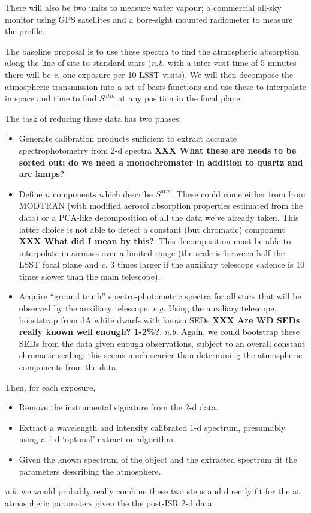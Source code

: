 \documentclass[12pt]{article}
\renewcommand{\c}{\textit{c.}\xspace}
\newcommand{\eg}{\textit{e.g.}\xspace}
\newcommand{\nb}{\textit{n.b.}\xspace}
\newcommand{\XXX}[1]{\textbf{XXX #1}\xspace}
\begin{document}
There will also be two units to measure water vapour;  a commercial all-sky monitor using GPS satellites
and a bore-sight mounted radiometer to measure the profile.

The baseline proposal is to use these spectra to find the atmospheric absorption along the line of site to
standard stars (\nb with a inter-visit time of 5 minutes there will be \c one exposure per 10 LSST visits).
We will then decompose the atmospheric transmission into a set of basis functions and use these to interpolate
in space and time to find $S^{atm}$ at any position in the focal plane.

The task of reducing these data has two phases:
\begin{itemize}
  \item Generate calibration products sufficient to extract accurate spectrophotometry from 2-d spectra
    \XXX{What these are needs to be sorted out; do we need a monochromater in addition to quartz and arc
      lamps?}

  \item Define $n$ components which describe $S^{atm}$.  These could come either from
    from MODTRAN (with modified aerosol absorption properties estimated from the data) or
    a PCA-like decomposition of all the data we've already taken.
    This latter choice is not able to detect a
    constant (but chromatic) component \XXX{What did I mean by this?}.  This decomposition must be able to interpolate in airmass over
    a limited range (the scale is between half the LSST focal plane and \c 3 times larger if the auxiliary
    telescope cadence is 10 times slower than the main telescope).

  \item Acquire ``ground truth'' spectro-photometric spectra for all stars that will be observed by the
    auxiliary telescope.  \eg Using the auxiliary telescope, booststrap from dA white dwarfs with
    known SEDs \XXX{Are WD SEDs really known well enough?  1-2\%?}.  \nb  Again, we could bootstrap
    these SEDs from the data given enough observations, subject to an overall constant chromatic scaling;
    this seems much scarier than determining the atmospheric components from the data.
\end{itemize}

Then, for each exposure,
\begin{itemize}
  \item Remove the instrumental signature from the 2-d data.
  \item Extract a wavelength and intensity calibrated 1-d spectrum, presumably using a 1-d `optimal'
    extraction algorithm.
  \item Given the known spectrum of the object and the extracted spectrum fit the parameters describing the
    atmosphere.
\end{itemize}
\nb we would probably really combine these two steps and directly fit for the
at atmospheric parameters given the the post-ISR 2-d data
\end{document}
